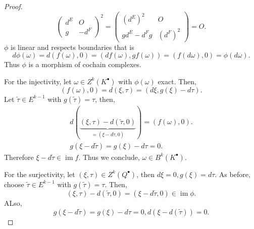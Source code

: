 \documentclass[8pt]{article}
\DeclareMathOperator{\image}{im}
\begin{document}
\begin{proof}
  \begin{equation*}
    \begin{pmatrix}
      d^E & O\\
      g & -d^F
    \end{pmatrix}^2 = \begin{pmatrix}
      (d^E)^2 & O\\
      gd^E-d^Fg & (d^F)^2
    \end{pmatrix}=O.
  \end{equation*}
  $\phi$ is linear and respects boundaries that is 
  \begin{equation*}
    d\phi(\omega) = d(f(\omega),0) = (df(\omega),gf(\omega))=(f(d\omega),0)=\phi(d\omega).
  \end{equation*}
  Thus $\phi$ is a morphism of cochain complexes.
  \par For the injectivity, let $\omega\in Z^k(K^\bullet)$ with $\phi(\omega)$ exact. Then,
  \begin{equation*}
  (f(\omega),0) = d(\xi,\tau)=(d\xi,g(\xi)-d\tau).
  \end{equation*}
  Let $\tilde{\tau}\in E^{k-1}$ with $g(\tilde{\tau})=\tau$, then,
  \begin{align*}
    d(\underbrace{(\xi,\tau)-d(\tilde{\tau},0)}_{=(\xi-d\tilde{\tau},0)})=(f(\omega),0).\\
    g(\xi-d\tilde{\tau})=g(\xi)-d\tau=0.
  \end{align*}
  Therefore $\xi-d\tilde{\tau}\in\image f$. Thus we conclude, $\omega\in B^k(K^\bullet)$.
  \par For the surjectivity, let $(\xi,\tau)\in Z^k(Q^\bullet)$, then $d\xi=0,g(\xi) = d\tau$. As before, choose $\tilde{\tau}\in E^{k-1}$ with $g(\tilde{\tau}) = \tau$. Then,
  \begin{equation*}
    (\xi,\tau)-d(\tilde{\tau},0)=(\xi-d\tilde{\tau},0)\in\image\phi.
  \end{equation*}
  ALso,
  \begin{equation*}
    g(\xi-d\tilde{\tau})=g(\xi)-d\tau=0,d(\xi-d(\tilde{\tau}))=0.
  \end{equation*}
\end{proof}
\end{document}
